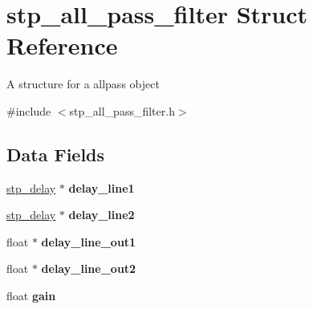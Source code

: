 \hypertarget{structstp__all__pass__filter}{}\section{stp\+\_\+all\+\_\+pass\+\_\+filter Struct Reference}
\label{structstp__all__pass__filter}


A structure for a allpass object ~\newline
  




{\ttfamily \#include $<$stp\+\_\+all\+\_\+pass\+\_\+filter.\+h$>$}

\subsection*{Data Fields}
\begin{DoxyCompactItemize}
\item 
\mbox{\label{structstp__all__pass__filter_a08c34a6d2507d32cb620fa705e0a1727}} 
\hyperlink{structstp__delay}{stp\+\_\+delay} $\ast$ {\bfseries delay\+\_\+line1}
\item 
\mbox{\label{structstp__all__pass__filter_ab63b071c4dacfd6be30b31c3065d6d5c}} 
\hyperlink{structstp__delay}{stp\+\_\+delay} $\ast$ {\bfseries delay\+\_\+line2}
\item 
\mbox{\label{structstp__all__pass__filter_a3c3105337a50c30937afe7398db18f0b}} 
float $\ast$ {\bfseries delay\+\_\+line\+\_\+out1}
\item 
\mbox{\label{structstp__all__pass__filter_a33d0a9baf211f0c293bc97edec87c3b4}} 
float $\ast$ {\bfseries delay\+\_\+line\+\_\+out2}
\item 
\mbox{\label{structstp__all__pass__filter_aca3852dab23cf0066809ecc1997fb58b}} 
float {\bfseries gain}
\end{DoxyCompactItemize}

